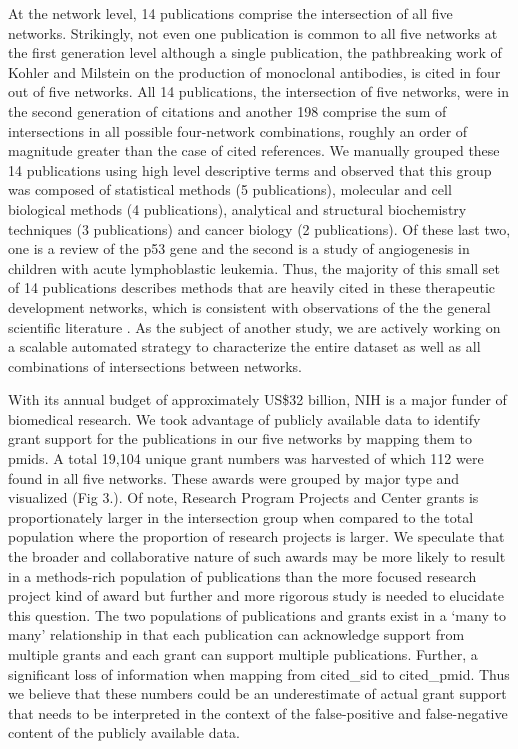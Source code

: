 \documentclass[10pt,letterpaper]{article}
\begin{document}
At the network level, 14 publications comprise the intersection of all five networks. Strikingly, not even one publication is common to all five networks at the first generation level although a single publication, the pathbreaking work of Kohler and Milstein on the production of monoclonal antibodies\cite{bibKohler}, is cited in four out of five networks. All 14 publications, the intersection of five networks, were in the second generation of citations and another 198 comprise the sum of intersections in all possible four-network combinations, roughly an order of magnitude greater than the case of cited references.  We manually grouped these 14 publications using high level descriptive terms and observed that this group was composed of  statistical methods (5 publications), molecular and cell biological methods (4 publications), analytical and structural biochemistry techniques (3 publications) and cancer biology (2 publications). Of these last two, one is a review of the p53 gene\cite{bibLevine} and the second is a study of angiogenesis in children with acute lymphoblastic leukemia\cite{bibFolkman}. Thus, the majority of this small set of 14 publications describes methods that are heavily cited in these therapeutic development networks, which is consistent with observations of the the general scientific literature \cite{bibVanNoorden}. As the subject of another study, we are actively working on a scalable automated strategy to characterize the entire dataset as well as all combinations of intersections between networks. 

With its annual budget of approximately US\$32 billion, NIH is a major funder of biomedical research. We took advantage of publicly available data\cite{bibNIHExPORTER} to identify grant support for the publications in our five networks by mapping them to pmids. A total 19,104 unique grant numbers was harvested of which 112 were found in all five networks. These awards were grouped by major type  and visualized (Fig 3.). Of note, Research Program Projects and Center grants is proportionately larger in the intersection group when compared to the total population where the proportion of research projects is larger. We speculate that the broader and collaborative nature of such awards may be more likely to result in a methods-rich population of publications than the more focused research project kind of award but further and more rigorous study is needed to elucidate this question.  The two populations of publications and grants exist in a `many to many' relationship in that each publication can acknowledge support from multiple grants and each grant can support multiple publications. Further, a significant loss of information when mapping from cited\_sid to cited\_pmid. Thus we believe that these numbers could be an underestimate of actual grant support that needs to be interpreted in the context of the false-positive and false-negative content of the publicly available data. 
\end{document}
